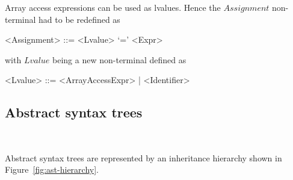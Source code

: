 \documentclass[11pt,a4paper]{scrartcl}
\begin{document}
Array access expressions can be used as lvalues. Hence the $Assignment$ non-terminal had to be redefined as
\begin{grammar}
  <Assignment> ::= <Lvalue> `=' <Expr>
\end{grammar}
with $Lvalue$ being a new non-terminal defined as
\begin{grammar}
  <Lvalue> ::= <ArrayAccessExpr> | <Identifier>
\end{grammar}

\subsection{Abstract syntax trees}~\label{sec:ast}

Abstract syntax trees are represented by an inheritance hierarchy shown in Figure~\ref{fig:ast-hierarchy}.
\end{document}
